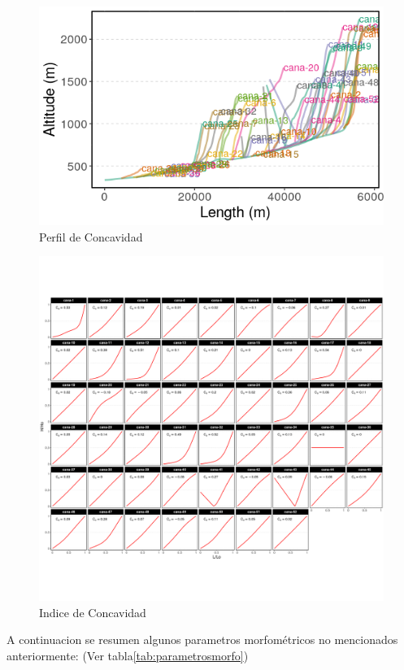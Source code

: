 \documentclass[11pt,]{article}
\begin{document}
\begin{figure}
\centering
\includegraphics{perfiles_cana.png}
\caption{Perfil de Concavidad\label{perfilconcavidad}}
\end{figure}

\begin{figure}
\centering
\includegraphics{indice_concavidad.png}
\caption{Indice de Concavidad\label{indiceconcavidad}}
\end{figure}

A continuacion se resumen algunos parametros morfométricos no
mencionados anteriormente: (Ver tabla\ref{tab:parametrosmorfo})
\end{document}
